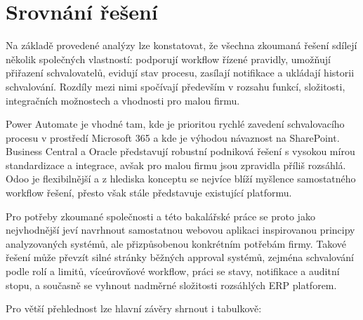 \section{Srovnání řešení}

Na základě provedené analýzy lze konstatovat, že všechna zkoumaná řešení sdílejí několik společných vlastností: podporují workflow řízené pravidly, umožňují přiřazení schvalovatelů, evidují stav procesu, zasílají notifikace a ukládají historii schvalování. Rozdíly mezi nimi spočívají především v rozsahu funkcí, složitosti, integračních možnostech a vhodnosti pro malou firmu.

Power Automate je vhodné tam, kde je prioritou rychlé zavedení schvalovacího procesu v prostředí Microsoft 365 a kde je výhodou návaznost na SharePoint. Business Central a Oracle představují robustní podniková řešení s vysokou mírou standardizace a integrace, avšak pro malou firmu jsou zpravidla příliš rozsáhlá. Odoo je flexibilnější a z hlediska konceptu se nejvíce blíží myšlence samostatného workflow řešení, přesto však stále představuje existující platformu.

Pro potřeby zkoumané společnosti a této bakalářské práce se proto jako nejvhodnější jeví navrhnout samostatnou webovou aplikaci inspirovanou principy analyzovaných systémů, ale přizpůsobenou konkrétním potřebám firmy. Takové řešení může převzít silné stránky běžných approval systémů, zejména schvalování podle rolí a limitů, víceúrovňové workflow, práci se stavy, notifikace a auditní stopu, a současně se vyhnout nadměrné složitosti rozsáhlých ERP platforem.

Pro větší přehlednost lze hlavní závěry shrnout i tabulkově:

